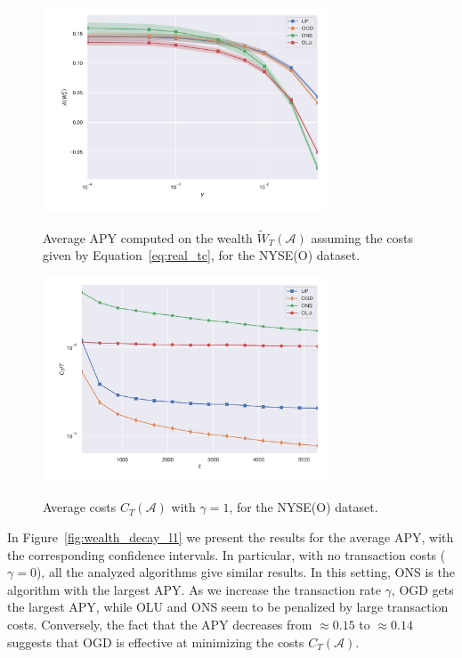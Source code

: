 \begin{figure}[ht!]
\centering
{\includegraphics[width=0.75\textwidth,keepaspectratio]{img/fig_w_decay_true.pdf}} 
\caption{ Average APY computed on the wealth $\tilde{W}_T(\mathcal A)$ assuming the costs given by Equation~\eqref{eq:real_tc}, for the NYSE(O) dataset.}
\label{fig:wealth_decay_true}
\end{figure}

\begin{figure}[ht!]
\centering
{\includegraphics[width=0.75\textwidth,keepaspectratio]{img/fig_costs.pdf}}
\caption{Average costs $C_T(\mathcal{A})$ with $\gamma = 1$, for the NYSE(O) dataset.}
\label{fig:costs}
\end{figure}

In Figure~\ref{fig:wealth_decay_l1} we present the results for the average APY, with the corresponding confidence intervals.
In particular, with no transaction costs ($\gamma = 0$), all the analyzed algorithms give similar results.
In this setting, ONS is the algorithm with the largest APY.
As we increase the transaction rate $\gamma$, OGD gets the largest APY, while OLU and ONS seem to be penalized by large transaction costs.
Conversely, the fact that the APY decreases from $\approx 0.15$ to $\approx 0.14$ suggests that OGD is effective at minimizing the costs $C_T(\mathcal{A})$.

